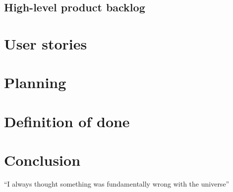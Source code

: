 \documentclass{article}
\begin{document}
\subsection{High-level product backlog}

\section{User stories}

\section{Planning}

\section{Definition of done}



\section{Conclusion}
``I always thought something was fundamentally wrong with the universe'' \citep{adams1995hitchhiker}



\end{document}
